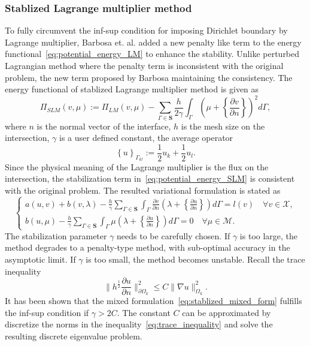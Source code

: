 \documentclass[preprint,12pt]{elsarticle}
\theoremstyle{remark}
\begin{document}
\subsubsection{Stablized Lagrange multiplier method}
To fully circumvent the inf-sup condition for imposing Dirichlet boundary by Lagrange multiplier, Barbosa et. al. \cite{barbosa1991finite} added a new penalty like term to the energy functional~\eqref{eq:potential_energy_LM} to enhance the stability. Unlike perturbed Lagrangian method where the penalty term is inconsistent with the original problem, the new term proposed by Barbosa maintaining the consistency. The energy functional of stablized Lagrange multiplier method is given as
\begin{equation}
    \Pi_{SLM}(v,\mu):=\Pi_{LM}(v,\mu)-\sum_{\Gamma\in\mathbf{S}}\frac{h}{2\gamma}\int_\Gamma(\mu+\left\{\frac{\partial{v}}{\partial{n}}\right\})^2d\Gamma,\label{eq:potential_energy_SLM}
\end{equation}
where $n$ is the normal vector of the interface, $h$ is the mesh size on the intersection, $\gamma$ is a user defined constant, the average operator
\begin{equation}
    \left\{u\right\}_{\Gamma_{kl}}:=\frac{1}{2}u_k+\frac{1}{2}u_l.
\end{equation}
Since the physical meaning of the Lagrange multiplier is the flux on the intersection, the stabilization term in~\eqref{eq:potential_energy_SLM} is consistent with the original problem. The resulted variational formulation is stated as
\begin{equation}
    \left\{
    \begin{array}{ll}
        a(u,v)+b(v,\lambda)-\frac{h}{\gamma}\sum_{\Gamma\in\mathbf{S}}\int_\Gamma\frac{\partial{v}}{\partial{n}}(\lambda+{\left\{\frac{\partial{u}}{\partial{n}}\right\}})d\Gamma=l(v) \quad \forall v\in{\mathcal{X}},\\
        b(u,\mu) - \frac{h}{\gamma}\sum_{\Gamma\in\mathbf{S}}\int_\Gamma\mu(\lambda+{\left\{\frac{\partial{u}}{\partial{n}}\right\}})d\Gamma=0 \quad \forall \mu\in{\mathcal{M}}.\label{eq:stablized_mixed_form}
    \end{array}
    \right.
\end{equation}
The stabilization parameter $\gamma$ needs to be carefully chosen. If $\gamma$ is too large, the method degrades to a penalty-type method, with sub-optimal accuracy in the asymptotic limit. If $\gamma$ is too small, the method becomes unstable. Recall the trace inequality
\begin{equation}
    \|h^{\frac{1}{2}}\frac{\partial{u}}{\partial{n}}\|_{\partial{\Omega_{k}}}^2\leq{C}\|\nabla{u}\|_{{\Omega_{k}}}^2.\label{eq:trace_inequality}
\end{equation}
It has been shown \cite{juntunen2015connection} that the mixed formulation~\eqref{eq:stablized_mixed_form} fulfills the inf-sup condition if $\gamma>2C$. The constant $C$ can be approximated by discretize the norms in the inequality~\eqref{eq:trace_inequality} and solve the resulting discrete eigenvalue problem. \par
\end{document}
